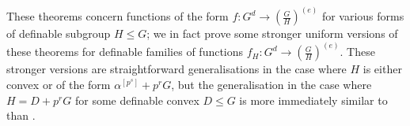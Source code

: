 \documentclass[a4paper,11pt]{article}
\newtheorem*{note}{Note}
\begin{document}
\noindent These theorems concern functions of the form $f:G^d\rightarrow (\frac{G}{H})^{(e)}$ for various forms of definable subgroup $H\leq G$; we in fact prove some stronger uniform versions of these theorems for definable families of functions $f_H:G^d\rightarrow (\frac{G}{H})^{(e)}$. These stronger versions are straightforward generalisations in the case where $H$ is either convex or of the form $\alpha^{[p^s]}+p^rG$, but the generalisation in the case where $H=D+p^rG$ for some definable convex $D\leq G$ is more immediately similar to  than .


\end{document}
